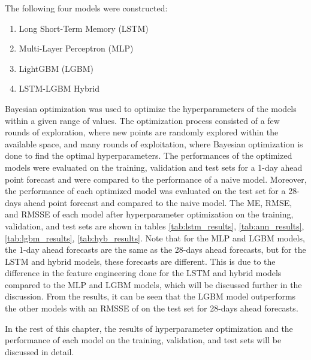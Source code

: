 The following four models were constructed: 
\begin{enumerate}
    \item Long Short-Term Memory (LSTM)
    \item Multi-Layer Perceptron (MLP)
    \item LightGBM (LGBM)
    \item LSTM-LGBM Hybrid
\end{enumerate}
Bayesian optimization was used to optimize the hyperparameters of the models within a given range of values.
The optimization process consisted of a few rounds of exploration, where new points are randomly explored within the available space, and many rounds of exploitation, where Bayesian optimization is done to find the optimal hyperparameters.
The performances of the optimized models were evaluated on the training, validation and test sets for a 1-day ahead point forecast and were compared to the performance of a naive model.
Moreover, the performance of each optimized model was evaluated on the test set for a 28-days ahead point forecast and compared to the naive model.
The ME, RMSE, and RMSSE of each model after hyperparameter optimization on the training, validation, and test sets are shown in tables \ref{tab:lstm_results}, \ref{tab:ann_results}, \ref{tab:lgbm_results}, \ref{tab:hyb_results}.
Note that for the MLP and LGBM models, the 1-day ahead forecasts are the same as the 28-days ahead forecasts, but for the LSTM and hybrid models, these forecasts are different.
This is due to the difference in the feature engineering done for the LSTM and hybrid models compared to the MLP and LGBM models, which will be discussed further in the discussion.
From the results, it can be seen that the LGBM model outperforms the other models with an RMSSE of \lgbmTstMonRMSSE{} on the test set for 28-days ahead forecasts.

In the rest of this chapter, the results of hyperparameter optimization and the performance of each model on the training, validation, and test sets will be discussed in detail. 

